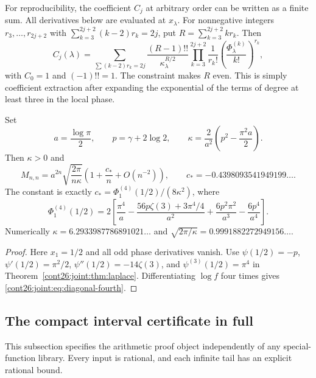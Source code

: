 For reproducibility, the coefficient $C_j$ at arbitrary order can be
written as a finite sum.  All derivatives below are evaluated at
$x_\lambda$.  For nonnegative integers $r_3,\ldots,r_{2j+2}$ with
$\sum_{k=3}^{2j+2}(k-2)r_k=2j$, put
$R=\sum_{k=3}^{2j+2}k r_k$.  Then
\begin{equation}\label{cont26:joint:eq:allorders}
 C_j(\lambda)=
 \sum_{\sum(k-2)r_k=2j}
 \frac{(R-1)!!}{\kappa_\lambda^{R/2}}
 \prod_{k=3}^{2j+2}
 \frac1{r_k!}\left(\frac{\Phi_\lambda^{(k)}}{k!}\right)^{r_k},
\end{equation}
with $C_0=1$ and $(-1)!!=1$.  The constraint makes $R$ even.
This is simply coefficient extraction after expanding the exponential
of the terms of degree at least three in the local phase.

\begin{corollary}
\label{cont26:joint:cor:diagonal}
Set
\[
 a=\frac{\log\pi}{2},\qquad p=\gamma+2\log2,\qquad
 \kappa=\frac{2}{a^2}\left(p^2-\frac{\pi^2a}{2}\right).
\]
Then $\kappa>0$ and
\begin{equation}\label{cont26:joint:eq:diagonal}
 M_{n,n}=a^{2n}\sqrt{\frac{2\pi}{n\kappa}}
 \left(1+\frac{c_*}{n}+O(n^{-2})\right),
 \qquad c_*=-0.4398093541949199\ldots.
\end{equation}
The constant is exactly $c_*=\Phi_1^{(4)}(1/2)/(8\kappa^2)$, where
\begin{equation}\label{cont26:joint:eq:diagonal-fourth}
 \Phi_1^{(4)}(1/2)=2\left[
 \frac{\pi^4}{a}
 -\frac{56p\zeta(3)+3\pi^4/4}{a^2}
 +\frac{6p^2\pi^2}{a^3}
 -\frac{6p^4}{a^4}\right].
\end{equation}
Numerically $\kappa=6.2933987786891021\ldots$ and
$\sqrt{2\pi/\kappa}=0.9991882272949156\ldots$.
\end{corollary}
\begin{proof}
Here $x_1=1/2$ and all odd phase derivatives vanish.  Use
$\psi(1/2)=-p$, $\psi'(1/2)=\pi^2/2$,
$\psi''(1/2)=-14\zeta(3)$, and $\psi^{(3)}(1/2)=\pi^4$ in
Theorem~\ref{cont26:joint:thm:laplace}.  Differentiating $\log f$ four
times gives \eqref{cont26:joint:eq:diagonal-fourth}.
\end{proof}

\subsection{The compact interval certificate in full}
\label{cont26:joint:subsec:certificate}

This subsection specifies the arithmetic proof object independently
of any special-function library.  Every input is rational, and each
infinite tail has an explicit rational bound.

